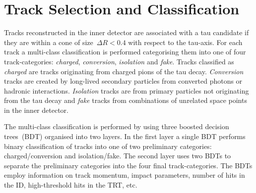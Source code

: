 \section{Track Selection and Classification}
\label{sec:reco_track_sel_classif}
%
Tracks reconstructed in the inner detector are associated with a tau candidate
if they are within a cone of size~$\Delta R < 0.4$ with respect to the tau-axis.
%
%
%
For each track a multi-class classification is performed categorising them into
one of four track-categories: \emph{charged}, \emph{conversion},
\emph{isolation} and \emph{fake}. Tracks classified as \emph{charged} are tracks
originating from charged pions of the tau decay. \emph{Conversion} tracks are
created by long-lived secondary particles from converted photons or hadronic
interactions. \emph{Isolation} tracks are from primary particles not originating
from the tau decay and \emph{fake} tracks from combinations of unrelated space
points in the inner detector.

The multi-class classification is performed by using three boosted decision
trees~(BDT) organised into two layers. In the first layer a single BDT performs
binary classification of tracks into one of two preliminary categories:
charged/conversion and isolation/fake. The second layer uses two BDTs to
separate the preliminary categories into the four final track-categories. The
BDTs employ information on track momentum, impact parameters, number of hits in
the ID, high-threshold hits in the TRT, etc.

